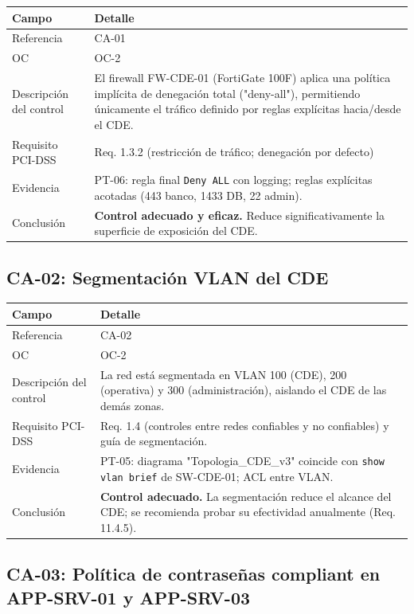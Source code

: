 \documentclass[11pt,a4paper]{article}
\begin{document}
\begin{tabularx}{\textwidth}{P{5cm}L}
\toprule
\textbf{Campo} & \textbf{Detalle} \\
\midrule
Referencia & CA-01 \\
OC & OC-2 \\
Descripción del control & El firewall FW-CDE-01 (FortiGate 100F) aplica una política implícita de denegación total ("deny-all"), permitiendo únicamente el tráfico definido por reglas explícitas hacia/desde el CDE. \\
Requisito PCI-DSS & Req. 1.3.2 (restricción de tráfico; denegación por defecto) \\
Evidencia & PT-06: regla final \texttt{Deny ALL} con logging; reglas explícitas acotadas (443 banco, 1433 DB, 22 admin). \\
Conclusión & \textbf{Control adecuado y eficaz.} Reduce significativamente la superficie de exposición del CDE. \\
\bottomrule
\end{tabularx}

\subsection{CA-02: Segmentación VLAN del CDE}

\begin{tabularx}{\textwidth}{P{5cm}L}
\toprule
\textbf{Campo} & \textbf{Detalle} \\
\midrule
Referencia & CA-02 \\
OC & OC-2 \\
Descripción del control & La red está segmentada en VLAN 100 (CDE), 200 (operativa) y 300 (administración), aislando el CDE de las demás zonas. \\
Requisito PCI-DSS & Req. 1.4 (controles entre redes confiables y no confiables) y guía de segmentación. \\
Evidencia & PT-05: diagrama "Topologia_CDE_v3" coincide con \texttt{show vlan brief} de SW-CDE-01; ACL entre VLAN. \\
Conclusión & \textbf{Control adecuado.} La segmentación reduce el alcance del CDE; se recomienda probar su efectividad anualmente (Req. 11.4.5). \\
\bottomrule
\end{tabularx}

\subsection{CA-03: Política de contraseñas compliant en APP-SRV-01 y APP-SRV-03}
\end{document}
